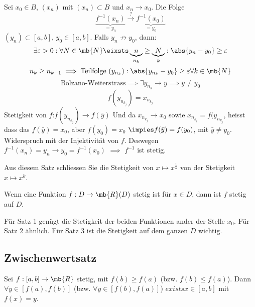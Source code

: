 \begin{Bew}
  Sei $x_0\in B$, $(x_n)$ mit $(x_n)\subset B$ und $x_n\to x_0$. Die Folge
  \[\underbrace{f^{-1}(x_n)}_{=y_n}\stackrel{?}{\to}\underbrace{f^{-1}(x_0)}_{=y_0}\]
  $(y_n)\subset\left[ a,b \right]$, $y_0\in\left[ a,b \right]$. Falls $y_n\not\to y_0$, dann:
  \[\exists\varepsilon>0: \forall N\in\mb{N}\eixsts \underbrace{n}_{n_k}\geq \underbrace{N}_{k}: \abs{y_n-y_0}\geq\varepsilon\]
  \[n_k\geq n_{k-1}\implies\text{Teilfolge } (y_{n_k}): \abs{y_{n_k}-y_0}\geq \varepsilon\forall k\in \mb{N}\]
  \[\text{Bolzano-Weiterstrass}\implies \exists y_{n_k}\to\bar{y}\implies \bar{y}\neq y_0\]
  \[f(y_{n_{k_j}})=x_{n_{k_j}}\]
  Stetigkeit von $f$:$f(y_{n_{k_j}})\to f(\bar y)$ Und da $x_{n_{k_j}}\to x_0$ sowie  $x_{n_{k_j}} = f(y_{n_{k_j}}$, heisst dass das $f(\bar y)=x_0$, aber $f(y_0)=x_0$ $\impies f(\bar y)=f(y_0)$, mit $\bar y\neq y_0$. Widerspruch mit der Injektivität von $f$. Deswegen $f^{-1}(x_n)=y_n\to y_0=f^{-1}(x_0)$ $\implies$ $f^{-1}$ ist stetig.
\end{Bew}
\begin{Bem}
  Aus diesem Satz schliessen Sie die Stetigkeit von $x\mapsto x^{\frac{1}{k}}$ von der Stetigkeit $x\mapsto x^k$.
\end{Bem}
\begin{Def}
  Wenn eine Funktion $f:D\to\mb{R}(D)$ stetig ist für $x\in D$, dann ist $f$ stetig auf $D$.
\end{Def}
\begin{Bem}
  Für Satz 1 genügt die Stetigkeit der beiden Funktionen ander der Stelle $x_0$. Für Satz 2 ähnlich. Für Satz 3 ist die Stetigkeit auf dem ganzen $D$ wichtig.
\end{Bem}
\subsection{Zwischenwertsatz}
\begin{Sat}
  Sei $f:\left[ a,b \right]\to\mb{R}$ stetig, mit $f(b)\geq f(a)$ (bzw. $f(b)\leq f(a)$). Dann $\forall y\in\left[ f(a),f(b) \right]$ (bzw. $\forall y\in\left[ f(b),f(a) \right]$) $exists x\in\left[ a,b \right]$ mit $f(x)=y$.
\end{Sat}
